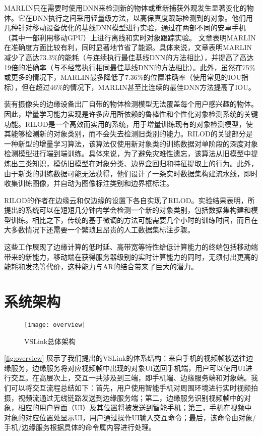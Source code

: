 MARLIN只在需要时使用DNN来检测新的物体或重新捕获外观发生显著变化的物体。它在DNN执行之间采用轻量级方法，以高保真度跟踪检测到的对象。他们用几种针对移动设备优化的基线DNN模型进行实验，通过在两部不同的安卓手机（其中一部利用移动GPU）上进行离线和实时对象跟踪实验。
文章表明MARLIN在准确度方面比较有利，同时显著地节省了能源。具体来说，文章表明MARLIN减少了高达73.3\%的能耗（与连续执行最佳基线DNN的方法相比），并提高了高达19倍的准确率（与不经常执行相同最佳基线DNN的方法相比）。此外，虽然在75\%或更多的情况下，MARLIN最多降低了7.36\%的位置准确率（使用常见的IOU指标），但在超过46\%的情况下，MARLIN甚至比连续的最佳DNN方法提高了IOU。

装有摄像头的边缘设备出厂自带的物体检测模型无法覆盖每个用户感兴趣的物体。因此，增量学习能力实现是许多应用所依赖的鲁棒性和个性化对象检测系统的关键功能。RILOD\cite{LiTasGho19}是一个高效而实用的系统，用于增量训练现有的对象检测模型，使其能够检测新的对象类别，而不会失去检测旧类别的能力。RILOD的关键部分是一种新型的增量学习算法，该算法仅使用新对象类的训练数据对单阶段的深度对象检测模型进行端到端训练。具体来说，为了避免灾难性遗忘，该算法从旧模型中提炼出三类知识，模仿旧模型在对象分类、边界盒回归和特征提取上的行为。此外，由于新类的训练数据可能无法获得，他们设计了一条实时数据集构建流水线，即时收集训练图像，并自动为图像标注类别和边界框标注。

RILOD的作者在边缘云和仅边缘的设置下各自实现了RILOD。实验结果表明，所提出的系统可以在短短几分钟内学会检测一个新的对象类别，包括数据集构建和模型训练。相比之下，传统的基于微调的方法可能需要几个小时的训练时间，而且在大多数情况下还需要一个繁琐且昂贵的人工数据集标注步骤。

这些工作展现了边缘计算的低时延、高带宽等特性给低计算能力的终端包括移动端带来的新能力，移动端在获得服务器级别的实时计算能力的同时，无须付出更高的能耗和发热等代价，这种能力与AR的结合带来了巨大的潜力。


\chapter{系统架构}
\label{chap:architec}

\begin{figure}[htbp]
	\centering
	\texttt{[image: overview]}
	\caption{VSLink总体架构}
	\label{fig:overview}
\end{figure}

\autoref{fig:overview} 展示了我们提出的VSLink的体系结构：来自手机的视频帧被送往边缘服务，边缘服务将对应视频帧中出现的对象UI送回手机端，用户可以使用UI进行交互。在高层次上，交互一共涉及到三端，即手机端、边缘服务端和对象端。我们可以将交互流程总结如下：首先，用户使用智能手机对周围环境进行实时视频拍摄，视频流通过无线链路发送到边缘服务端；第二，边缘服务识别视频帧中的对象，相应的用户界面（UI）及其位置将被发送到智能手机；第三，手机在视频中对象的对应位置处显示UI，用户通过操作UI输入交互命令；最后，该命令由对象/手机/边缘服务根据具体的命令属内容进行处理。

